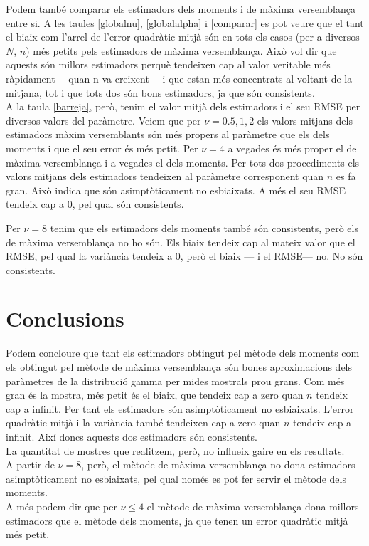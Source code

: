 \documentclass[12pt, catalan]{article}
\numberwithin{table}{section}
\numberwithin{figure}{section}
\numberwithin{equation}{section}
\begin{document}
Podem també comparar els estimadors dels moments i de màxima versemblança entre si. A les taules \ref{globalnu}, \ref{globalalpha} i \ref{comparar} es pot veure que el tant el biaix com l'arrel de l'error quadràtic mitjà són en tots els casos (per a diversos $N$, $n$) més petits pels estimadors de màxima versemblança. Això vol dir que aquests són millors estimadors perquè tendeixen cap al valor veritable més ràpidament ---quan n va creixent--- i que estan més concentrats al voltant de la mitjana, tot i que tots dos són bons estimadors, ja que són consistents.
\\
A la taula \ref{barreja}, però, tenim el valor mitjà dels estimadors i el seu RMSE per diversos valors del paràmetre. Veiem que per $\nu=0.5,1,2$ els valors mitjans dels estimadors màxim versemblants són més propers al paràmetre que els dels moments i que el seu error és més petit. Per $\nu=4$ a vegades és més proper el de màxima versemblança i a vegades el dels moments. Per tots dos procediments els valors mitjans dels estimadors tendeixen al paràmetre corresponent quan $n$ es fa gran. Això indica que són asimptòticament no esbiaixats. A més el seu RMSE tendeix cap a 0, pel qual són consistents.

Per $\nu=8$ tenim que els estimadors dels moments també són consistents, però els de màxima versemblança no ho són. Els biaix tendeix cap al mateix valor que el RMSE, pel qual la variància tendeix a 0, però el biaix --- i el RMSE--- no. No són consistents.

\section{Conclusions}

Podem concloure que tant els estimadors obtingut pel mètode dels moments com els obtingut pel mètode de màxima versemblança són bones aproximacions dels paràmetres de la distribució gamma per mides mostrals prou grans. Com més gran és la mostra, més petit és el biaix, que tendeix cap a zero quan $n$ tendeix cap a infinit. Per tant els estimadors són asimptòticament no esbiaixats. L'error quadràtic mitjà i la variància també tendeixen cap a zero quan $n$ tendeix cap a infinit. Així doncs aquests dos estimadors són consistents.
\\
La quantitat de mostres que realitzem, però, no influeix gaire en els resultats.
\\
A partir de $\nu=8$, però, el mètode de màxima versemblança no dona estimadors asimptòticament no esbiaixats, pel qual només es pot fer servir el mètode dels moments.
\\
A més podem dir que per $\nu\leq4$ el mètode de màxima versemblança dona millors estimadors que el mètode dels moments, ja que tenen un error quadràtic mitjà més petit.
\newpage




\end{document}
